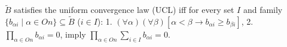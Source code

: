 $\tilde{B}$ satisfies the uniform convergence law (UCL) iff for every set $I$ and family $\{b_{\alpha i} \mid \alpha \in On\} \subseteq \tilde{B}$ ($i \in I$):
1. $(\forall \alpha)(\forall \beta)[\alpha < \beta \rightarrow b_{\alpha i} \geq b_{\beta i}]$,
2. $\prod_{\alpha \in On} b_{\alpha i} = 0$,
imply $\prod_{\alpha \in On} \sum_{i \in I} b_{\alpha i} = 0$.
